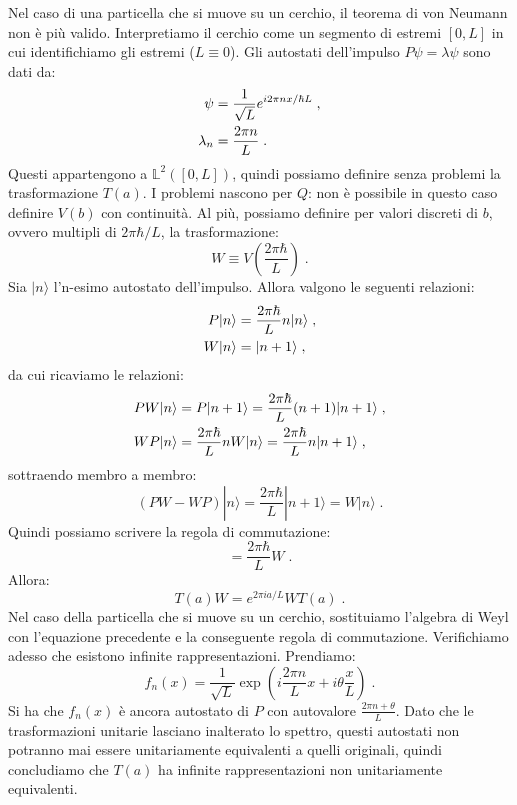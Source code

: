 \documentclass[12pt,a4paper]{report}
\theoremstyle{definition}
\numberwithin{equation}{section}
\newcommand{\ket}{\rangle}
\begin{document}
Nel caso di una particella che si muove su un cerchio, il teorema di von Neumann non è più valido. Interpretiamo il cerchio come un segmento di estremi $[0,L]$ in cui identifichiamo gli estremi ($L\equiv 0$). Gli autostati dell'impulso $P\psi=\lambda\psi$ sono dati da:
\begin{align}
\psi &= \frac{1}{\sqrt{L}}e^{i2\pi nx/\hbar L}\;, \notag \\
\lambda_n &= \frac{2\pi n}{L}\;.
\end{align}
Questi appartengono a $\mathbb{L}^2([0,L])$, quindi possiamo definire senza problemi la trasformazione $T(a)$. I problemi nascono per $Q$: non è possibile in questo caso definire $V(b)$ con continuità. Al più, possiamo definire per valori discreti di $b$, ovvero multipli di $2\pi\hbar/L$, la trasformazione:
\begin{equation}
W\equiv V\left(\frac{2\pi\hbar}{L}\right)\;.
\end{equation}
Sia $|n\ket$ l'n-esimo autostato dell'impulso. Allora valgono le seguenti relazioni:
\begin{align}
P|n\ket&=\frac{2\pi\hbar}{L}n|n\ket \notag\;, \\
W|n\ket &= |n+1\ket\;,
\end{align}
da cui ricaviamo le relazioni:
\begin{align}
PW|n\ket&=P|n+1\ket=\frac{2\pi\hbar}{L}(n+1)|n+1\ket \notag\;, \\
WP|n\ket&=\frac{2\pi\hbar}{L}nW|n\ket=\frac{2\pi\hbar}{L}n|n+1\ket\;,
\end{align}
sottraendo membro a membro:
\begin{equation}
(PW-WP)|n\ket=\frac{2\pi\hbar}{L}|n+1\ket=W|n\ket\;.
\end{equation}
Quindi possiamo scrivere la regola di commutazione:
\begin{equation}
[P,W]=\frac{2\pi\hbar}{L}W\;.
\end{equation}
Allora:
\begin{equation}
T(a)W=e^{2\pi ia/L}WT(a)\;.
\end{equation}
Nel caso della particella che si muove su un cerchio, sostituiamo l'algebra di Weyl con l'equazione precedente e la conseguente regola di commutazione. Verifichiamo adesso che esistono infinite rappresentazioni. Prendiamo:
\begin{equation}
f_n(x)=\frac{1}{\sqrt{L}}\exp\left(i\frac{2\pi n}{L}x+i\theta\frac{x}{L}\right)\;.
\end{equation}
Si ha che $f_n(x)$ è ancora autostato di $P$ con autovalore $\frac{2\pi n+\theta}{L}$. Dato che le trasformazioni unitarie lasciano inalterato lo spettro, questi autostati non potranno mai essere unitariamente equivalenti a quelli originali, quindi concludiamo che $T(a)$ ha infinite rappresentazioni non unitariamente equivalenti.
\end{document}
